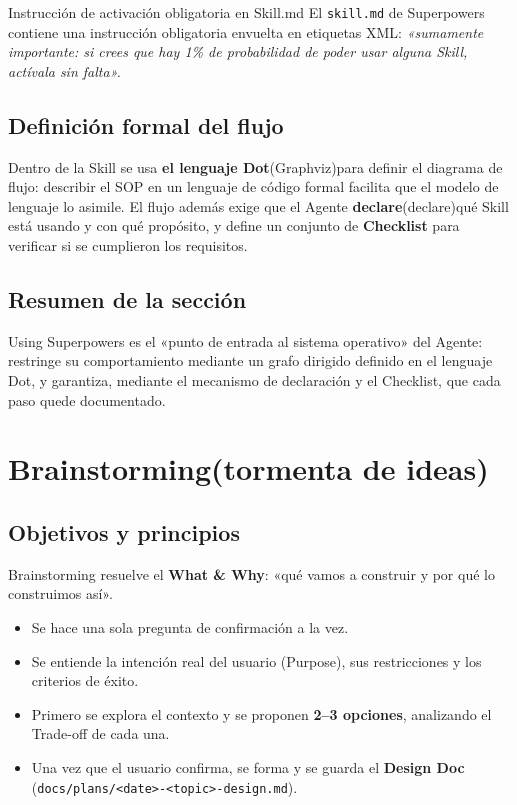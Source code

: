 \documentclass[a4paper]{article}
\begin{document}
\begin{importantbox}{Instrucción de activación obligatoria en Skill.md}
El \texttt{skill.md} de Superpowers contiene una instrucción obligatoria envuelta en etiquetas XML: \textit{«sumamente importante: si crees que hay 1\% de probabilidad de poder usar alguna Skill, actívala sin falta».}
\end{importantbox}

\subsection{Definición formal del flujo}

Dentro de la Skill se usa \textbf{el lenguaje Dot}(Graphviz)para definir el diagrama de flujo: describir el SOP en un lenguaje de código formal facilita que el modelo de lenguaje lo asimile. El flujo además exige que el Agente \textbf{declare}(declare)qué Skill está usando y con qué propósito, y define un conjunto de \textbf{Checklist} para verificar si se cumplieron los requisitos.

\subsection{Resumen de la sección}

Using Superpowers es el «punto de entrada al sistema operativo» del Agente: restringe su comportamiento mediante un grafo dirigido definido en el lenguaje Dot, y garantiza, mediante el mecanismo de declaración y el Checklist, que cada paso quede documentado.

\section{Brainstorming(tormenta de ideas)}

\subsection{Objetivos y principios}

Brainstorming resuelve el \textbf{What \& Why}: «qué vamos a construir y por qué lo construimos así».

\begin{itemize}
    \item Se hace una sola pregunta de confirmación a la vez.
    \item Se entiende la intención real del usuario (Purpose), sus restricciones y los criterios de éxito.
    \item Primero se explora el contexto y se proponen \textbf{2--3 opciones}, analizando el Trade-off de cada una.
    \item Una vez que el usuario confirma, se forma y se guarda el \textbf{Design Doc} (\texttt{docs/plans/<date>-<topic>-design.md}).
\end{itemize}
\end{document}
